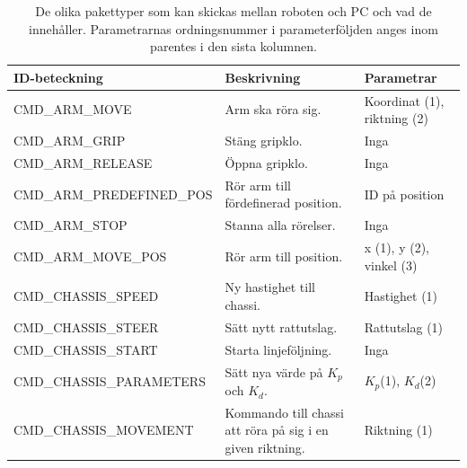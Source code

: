 \begin{table}[H]
\label{commands}
\begin{tabularx}{\textwidth}{|l|X|X|}
\hline
\textbf{ID-beteckning} & \textbf{Beskrivning} & \textbf{Parametrar} \\ \hline
CMD\_ARM\_MOVE & Arm ska röra sig. & Koordinat (1), riktning (2) \\ \hline
CMD\_ARM\_GRIP & Stäng gripklo. & Inga \\ \hline
CMD\_ARM\_RELEASE & Öppna gripklo. & Inga \\ \hline
CMD\_ARM\_PREDEFINED\_POS & Rör arm till fördefinerad position. & ID på position \\ \hline
CMD\_ARM\_STOP & Stanna alla rörelser. & Inga \\ \hline
CMD\_ARM\_MOVE\_POS & Rör arm till position. & x (1), y (2), vinkel (3) \\ \hline
CMD\_CHASSIS\_SPEED & Ny hastighet till chassi. & Hastighet (1) \\ \hline
CMD\_CHASSIS\_STEER & Sätt nytt rattutslag. & Rattutslag (1) \\ \hline
CMD\_CHASSIS\_START & Starta linjeföljning. & Inga \\ \hline
CMD\_CHASSIS\_PARAMETERS & Sätt nya värde på $K_p$ och $K_d$. & $K_p$(1), $K_d$(2) \\ \hline
CMD\_CHASSIS\_MOVEMENT & Kommando till chassi att röra på sig i en given riktning. & Riktning (1) \\ \hline
\end{tabularx}
\caption{De olika pakettyper som kan skickas mellan roboten och PC och vad de innehåller. Parametrarnas ordningsnummer i parameterföljden anges inom parentes i den sista kolumnen.}
\end{table}


